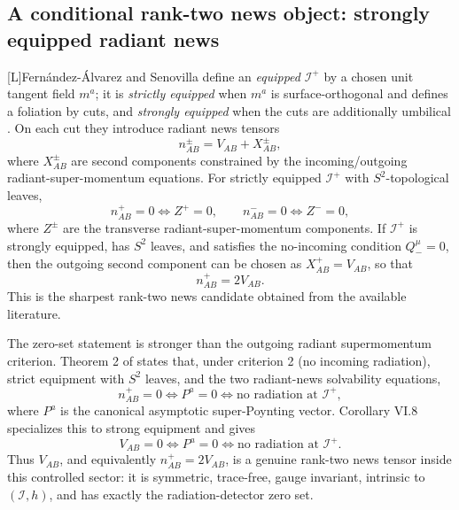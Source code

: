 \documentclass[11pt,a4paper]{article}
\newcommand{\scri}{\mathscr{I}}
\newcommand{\statusL}{\textsf{[L]}}
\begin{document}
\subsection{A conditional rank-two news object: strongly equipped radiant news}

\statusL Fern{\'a}ndez-{\'A}lvarez and Senovilla define an \emph{equipped} \(\scri^+\) by a chosen unit tangent field \(m^a\); it is \emph{strictly equipped} when \(m^a\) is surface-orthogonal and defines a foliation by cuts, and \emph{strongly equipped} when the cuts are additionally umbilical \cite{fabSen2022asymptotic}.  On each cut they introduce radiant news tensors
\begin{equation}
  n^\pm_{AB}=V_{AB}+X^\pm_{AB},
\end{equation}
where \(X^\pm_{AB}\) are second components constrained by the incoming/outgoing radiant-super-momentum equations.  For strictly equipped \(\scri^+\) with \(S^2\)-topological leaves,
\begin{equation}
  n^+_{AB}=0\iff Z^+=0,
  \qquad
  n^-_{AB}=0\iff Z^-=0 ,
\end{equation}
where \(Z^\pm\) are the transverse radiant-super-momentum components.  If \(\scri^+\) is strongly equipped, has \(S^2\) leaves, and satisfies the no-incoming condition \(Q_-^\mu=0\), then the outgoing second component can be chosen as \(X^+_{AB}=V_{AB}\), so that
\begin{equation}\label{eq:strong-news}
  n^+_{AB}=2V_{AB}.
\end{equation}
This is the sharpest rank-two news candidate obtained from the available literature.

The zero-set statement is stronger than the outgoing radiant supermomentum criterion.  Theorem 2 of \cite{fabSen2022asymptotic} states that, under criterion 2 (no incoming radiation), strict equipment with \(S^2\) leaves, and the two radiant-news solvability equations,
\begin{equation}
  n^+_{AB}=0
  \iff
  P^a=0
  \iff
  \text{no radiation at }\scri^+ ,
\end{equation}
where \(P^a\) is the canonical asymptotic super-Poynting vector.  Corollary VI.8 specializes this to strong equipment and gives
\begin{equation}\label{eq:V-zero-P-zero}
  V_{AB}=0
  \iff
  P^a=0
  \iff
  \text{no radiation at }\scri^+ .
\end{equation}
Thus \(V_{AB}\), and equivalently \(n^+_{AB}=2V_{AB}\), is a genuine rank-two news tensor inside this controlled sector: it is symmetric, trace-free, gauge invariant, intrinsic to \((\scri,h)\), and has exactly the radiation-detector zero set.
\end{document}
